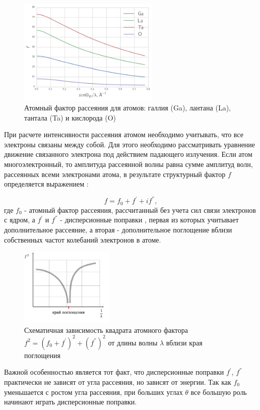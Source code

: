 \begin{figure}[H]
  \centering
  \includegraphics[width=0.6\textwidth]{images/atom_factor_GaLaTa.png}
  \caption{ Атомный фактор рассеяния для атомов: галлия (Ga), лантана (La), тантала (Ta) и  кислорода (O)}
  \label{ris:atom_factor_GaLaTa}
\end{figure}

При расчете интенсивности рассеяния атомом необходимо учитывать,
что все электроны связаны между собой. Для этого необходимо рассматривать
уравнение движение связанного электрона под действием падающего излучения.
Если атом многоэлектронный, то амплитуда рассеянной волны равна сумме амплитуд волн,
рассеянных всеми электронами атома, в результате структурный фактор $f$
определяется выражением \cite{iveronova1972}:

\begin{equation}
  f = f_0 + f^{'} + i f^{''},
 \end{equation}
\noindent
где $f_0$ - атомный фактор рассеяния, рассчитанный без учета сил связи электронов
 с ядром, а $f^{'}$ и $f^{''}$ - дисперсионные поправки \cite{f0f1f12},
 первая из которых учитывает дополнительное рассеяние,
а вторая - дополнительное поглощение вблизи собственных частот колебаний электронов в атоме.

 \begin{figure}[H]
   \centering
   \includegraphics[width=0.4\textwidth]{images/dispers_f.png}
   \caption{ Схематичная зависимость квадрата атомного фактора $f^2 = (f_0 + f^{'})^2 + (f^{''})^2 $ от
   длины волны $\lambda$ вблизи края поглощения}
   \label{ris:dispers_f}
\end{figure}

Важной особенностью является тот факт, что дисперсионные поправки $f^{'}$, $f^{''}$
практически не зависят от угла рассеяния, но зависят от энергии. Так как $f_0$ уменьшается
с ростом угла рассеяния, при больших углах $\theta$ все большую роль начинают играть дисперсионные поправки.
